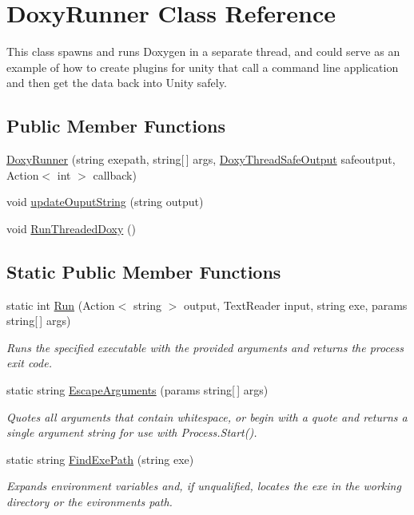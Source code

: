 \hypertarget{class_doxy_runner}{}\section{Doxy\+Runner Class Reference}
\label{class_doxy_runner}


This class spawns and runs Doxygen in a separate thread, and could serve as an example of how to create plugins for unity that call a command line application and then get the data back into Unity safely.  


\subsection*{Public Member Functions}
\begin{DoxyCompactItemize}
\item 
\hyperlink{class_doxy_runner_aed7742f6732027e7427393d727898eba}{Doxy\+Runner} (string exepath, string\mbox{[}$\,$\mbox{]} args, \hyperlink{class_doxy_thread_safe_output}{Doxy\+Thread\+Safe\+Output} safeoutput, Action$<$ int $>$ callback)
\item 
void \hyperlink{class_doxy_runner_a4474ed980f895f97ac3517fe85834259}{update\+Ouput\+String} (string output)
\item 
void \hyperlink{class_doxy_runner_a0a838402bf7b6661d4a1959c1b57aeb6}{Run\+Threaded\+Doxy} ()
\end{DoxyCompactItemize}
\subsection*{Static Public Member Functions}
\begin{DoxyCompactItemize}
\item 
static int \hyperlink{class_doxy_runner_a7458975df0c43d397051f225d6def184}{Run} (Action$<$ string $>$ output, Text\+Reader input, string exe, params string\mbox{[}$\,$\mbox{]} args)
\begin{DoxyCompactList}\small\item\em Runs the specified executable with the provided arguments and returns the process\textquotesingle{} exit code. \end{DoxyCompactList}\item 
static string \hyperlink{class_doxy_runner_a9e1ad0bb37f42899aeac2e2fb59cb769}{Escape\+Arguments} (params string\mbox{[}$\,$\mbox{]} args)
\begin{DoxyCompactList}\small\item\em Quotes all arguments that contain whitespace, or begin with a quote and returns a single argument string for use with Process.\+Start(). \end{DoxyCompactList}\item 
static string \hyperlink{class_doxy_runner_a0923bf6769c3b99b4fb8e9ce67877a94}{Find\+Exe\+Path} (string exe)
\begin{DoxyCompactList}\small\item\em Expands environment variables and, if unqualified, locates the exe in the working directory or the evironment\textquotesingle{}s path. \end{DoxyCompactList}\end{DoxyCompactItemize}
